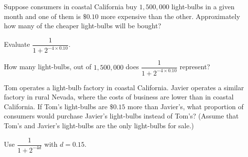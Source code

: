 \documentclass{ximera}
\begin{document}
\begin{question}
Suppose consumers in coastal California buy $1,500,000$ light-bulbs in a given month and one of them is $\$0.10$ more expensive than the other. Approximately how many of the cheaper light-bulbs will be bought?


 \begin{multipleChoice}
    \end{multipleChoice}
\begin{hint}
Evaluate $\dfrac{1}{1+2^{-4\times 0.10}}$.
\end{hint}
\begin{hint}
How many light-bulbs, out of $1,500,000$ does $\dfrac{1}{1+2^{-4\times 0.10}}$ represent?
\end{hint}

\end{question}

\begin{question}

Tom operates a light-bulb factory in coastal California. Javier operates a similar factory in rural Nevada, where the costs of business are lower than in coastal California. If Tom's light-bulbs are $\$0.15$ more than Javier's, what proportion of consumers would purchase Javier's light-bulbs instead of Tom's? (Assume that Tom's and Javier's light-bulbs are the only light-bulbs for sale.)

\begin{multipleChoice}
\end{multipleChoice}
\begin{hint}
Use $\dfrac{1}{1+2^{-4d}}$ with $d=0.15$.
\end{hint}

\end{question}
\end{document}
